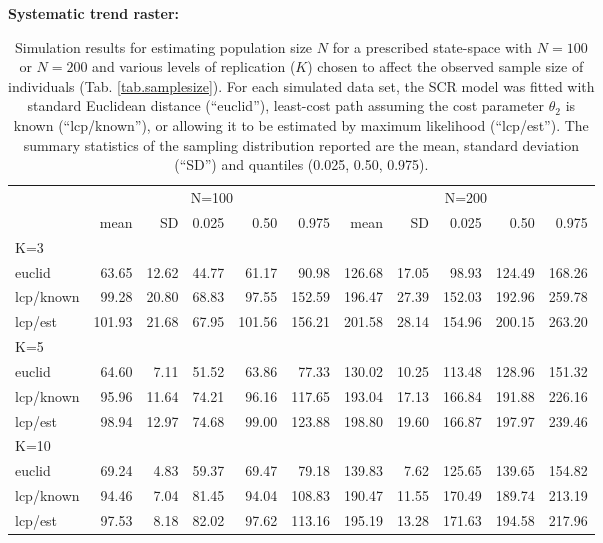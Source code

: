 \documentclass[12pt]{article}
\begin{document}
\begin{table}
{\small
\caption{Simulation results for estimating population size $N$ for a prescribed state-space with
$N=100$ or $N=200$ and various levels of replication ($K$) chosen to affect the observed sample
size of individuals (Tab. \ref{tab.samplesize}). For each simulated data set, the SCR model was fitted with
standard Euclidean distance (``euclid''), least-cost path assuming the
cost parameter $\theta_2$ is known (``lcp/known''), or allowing it to
be estimated by maximum likelihood (``lcp/est'').
The summary statistics of the
sampling distribution reported are the mean, standard deviation
(``SD'') and quantiles (0.025, 0.50, 0.975). 
}
{\bf Systematic trend raster:} \\
\begin{tabular}{l|rrrrr|rrrrr}
         & \multicolumn{5}{c}{N=100   } & \multicolumn{5}{c}{N=200  }  \\
         &   mean &  SD  & 0.025 & 0.50 & 0.975  & mean  & SD   & 0.025 & 0.50  & 0.975 \\ \hline
K=3      &        &      &       &      &        &       &      &       &       &       \\
euclid   &   63.65& 12.62& 44.77 & 61.17&  90.98 & 126.68& 17.05&  98.93& 124.49& 168.26 \\
lcp/known&   99.28& 20.80& 68.83 & 97.55& 152.59 & 196.47& 27.39& 152.03& 192.96& 259.78\\
lcp/est  &  101.93& 21.68& 67.95 &101.56& 156.21 & 201.58& 28.14& 154.96& 200.15& 263.20\\
K=5      &        &      &       &      &        &       &      &       &       &        \\
euclid   &  64.60 & 7.11 & 51.52 & 63.86&  77.33 & 130.02& 10.25& 113.48& 128.96& 151.32\\
lcp/known&  95.96 &11.64 & 74.21 & 96.16& 117.65 & 193.04& 17.13& 166.84& 191.88& 226.16\\
lcp/est  &  98.94 &12.97 & 74.68 & 99.00& 123.88 & 198.80& 19.60& 166.87& 197.97& 239.46\\
K=10     &        &      &       &      &        &       &      &       &       &       \\
euclid   &  69.24 & 4.83 & 59.37 & 69.47&  79.18 & 139.83&  7.62& 125.65& 139.65& 154.82\\
lcp/known&  94.46 & 7.04 & 81.45 & 94.04& 108.83 & 190.47& 11.55& 170.49& 189.74& 213.19\\
lcp/est  &  97.53 & 8.18 & 82.02 & 97.62& 113.16 & 195.19& 13.28& 171.63& 194.58& 217.96\\ \hline

\end{tabular}}
\end{table}
\end{document}
